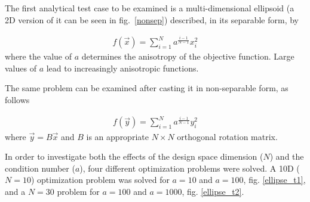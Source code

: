 The first analytical test case to be examined is a multi-dimensional ellipsoid (a 2D version of it can be seen in fig.\ \ref{nonsep}) described, in its separable form, by   


\begin{eqnarray}
   f(\vec{x})=\sum^{N}_{i=1} a^{\frac{i-1}{N-1}}x_i^2
   \label{ellipse} 
\end{eqnarray}
where the value of $a$ determines the anisotropy of the objective function. Large values of $a$ lead to increasingly anisotropic functions.

The same problem can be examined after casting it in non-separable form, as follows

\begin{eqnarray}
   f(\vec{y})=\sum^{N}_{i=1}a^{\frac{i-1}{N-1}}y_i^2
   \label{ellipse} 
\end{eqnarray}
where $\vec{y}=B\vec{x}$ and $B$ is an appropriate $N\times N$ orthogonal rotation matrix.

In order to investigate both the effects of the design space dimension ($N$) and the condition number ($a$), four different optimization problems were solved. A 10D ($N\!=\!10$) optimization problem was solved for $a\!=\!10$ and $a\!=\!100$,  fig. \ref{ellipse_t1}, and a $N\!=\!30$ problem for $a\!=\!100$ and $a\!=\!1000$, fig. \ref{ellipse_t2}. 


